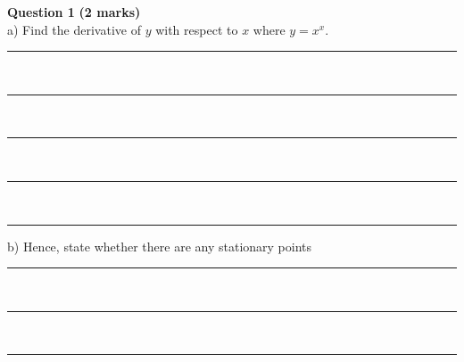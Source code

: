 \documentclass[a4paper,12pt]{article}
\begin{document}
\noindent \textbf{Question 1} \hfill \textbf{(2 marks)} \\[0.3cm]
a) Find the derivative of \( y \) with respect to \( x \) where \( y = x^x \). \hfill {} \\[1cm]
\rule{\textwidth}{0.5pt} \\[0.7cm]
\rule{\textwidth}{0.5pt} \\[0.7cm]
\rule{\textwidth}{0.5pt} \\[0.7cm]
\rule{\textwidth}{0.5pt} \\[0.7cm]
\rule{\textwidth}{0.5pt} \newpage
\noindent b) Hence, state whether there are any stationary points \hfill {} \\[1cm]
\rule{\textwidth}{0.5pt} \\[0.7cm]
\rule{\textwidth}{0.5pt} \\[0.7cm]
\rule{\textwidth}{0.5pt} \\[2cm]
\end{document}
